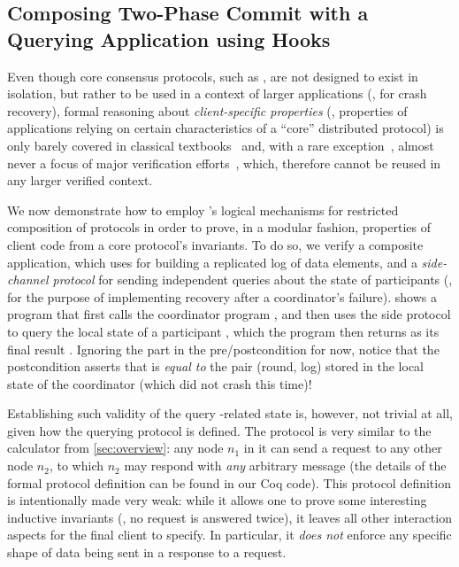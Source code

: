 \subsection{Composing Two-Phase Commit with a Querying Application
  using Hooks}
\label{sec:composing-two-phase}


Even though core consensus protocols, such as , are not
designed to exist in isolation, but rather to be used in a context of
larger applications (\eg, for crash recovery), formal reasoning about
\emph{client-specific properties} (\ie, properties of applications
relying on certain characteristics of a ``core'' distributed protocol) is only
barely covered in classical textbooks~\cite{Weikum-Vossen:TIS02} and,
with a rare exception~\cite{Lesani-al:POPL16}, almost never a focus of
major verification
efforts~\cite{Woos-al:CPP16,Hawblitzel-al:SOSP15,rahli:eventml-avocs},
which, therefore cannot be reused in any larger verified context.

We now demonstrate how to employ \disel's logical mechanisms for
restricted composition of protocols in order to prove, in a modular
fashion, properties of client code from a core protocol's invariants.
%
To do so, we verify a composite application, which uses  for
building a replicated log of data elements, and a \emph{side-channel
  protocol} for sending independent queries about the state of
 participants (\eg, for the purpose of implementing recovery
after a coordinator's failure).
%
 shows a program that first calls the
coordinator program , and then uses the side
protocol to query the local state of a participant , which
the program then returns as its final result .  Ignoring the
 part in the pre/postcondition for now, notice that
the postcondition asserts that  is \emph{equal to} the pair
 (round, log) stored in the local state of the coordinator
(which did not crash this time)!

Establishing such validity of the query \wrt {}-related state
is, however, not trivial at all, given how the querying protocol is
defined. The protocol  is very similar to the calculator
from \cref{sec:overview}: any node $n_1$ in it can send a
request to any other node $n_2$, to which $n_2$ may respond with
\emph{any} arbitrary message (the details of the formal protocol
definition can be found in our Coq code). This protocol definition is
intentionally made very weak: while it allows one to prove some
interesting inductive invariants (\eg, no request is answered twice),
it leaves all other interaction aspects for the final client to
specify. In particular, it \emph{does not} enforce any specific shape
of data being sent in a response to a request.

